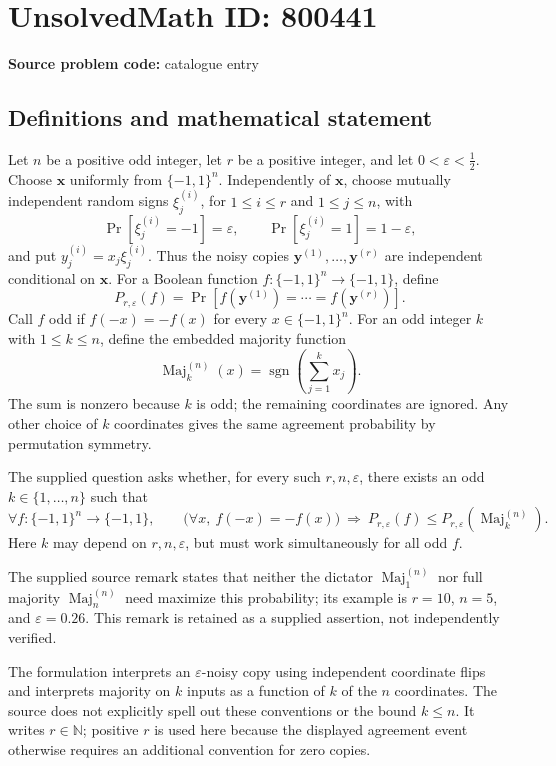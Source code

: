 \documentclass[11pt]{article}
\begin{document}
\section*{UnsolvedMath ID: 800441}
\textbf{Source problem code:} catalogue entry
\subsection{Definitions and mathematical statement}
Let \(n\) be a positive odd integer, let \(r\) be a positive integer, and let \(0<\varepsilon<\tfrac12\). Choose \(\mathbf{x}\) uniformly from \(\{-1,1\}^n\). Independently of \(\mathbf{x}\), choose mutually independent random signs \(\xi_j^{(i)}\), for \(1\le i\le r\) and \(1\le j\le n\), with
\[
\Pr[\xi_j^{(i)}=-1]=\varepsilon,\qquad \Pr[\xi_j^{(i)}=1]=1-\varepsilon,
\]
and put \(y_j^{(i)}=x_j\xi_j^{(i)}\). Thus the noisy copies \(\mathbf{y}^{(1)},\ldots,\mathbf{y}^{(r)}\) are independent conditional on \(\mathbf{x}\). For a Boolean function \(f:\{-1,1\}^n\to\{-1,1\}\), define
\[
P_{r,\varepsilon}(f)=\Pr\!\left[f(\mathbf{y}^{(1)})=\cdots=f(\mathbf{y}^{(r)})\right].
\]
Call \(f\) odd if \(f(-x)=-f(x)\) for every \(x\in\{-1,1\}^n\). For an odd integer \(k\) with \(1\le k\le n\), define the embedded majority function
\[
\operatorname{Maj}_{k}^{(n)}(x)=\operatorname{sgn}\!\left(\sum_{j=1}^{k}x_j\right).
\]
The sum is nonzero because \(k\) is odd; the remaining coordinates are ignored. Any other choice of \(k\) coordinates gives the same agreement probability by permutation symmetry.

The supplied question asks whether, for every such \(r,n,\varepsilon\), there exists an odd \(k\in\{1,\ldots,n\}\) such that
\[
\forall f:\{-1,1\}^n\to\{-1,1\},\qquad
\bigl(\forall x,\ f(-x)=-f(x)\bigr)
\ \Longrightarrow\ 
P_{r,\varepsilon}(f)\le P_{r,\varepsilon}\!\left(\operatorname{Maj}_{k}^{(n)}\right).
\]
Here \(k\) may depend on \(r,n,\varepsilon\), but must work simultaneously for all odd \(f\).

The supplied source remark states that neither the dictator \(\operatorname{Maj}_{1}^{(n)}\) nor full majority \(\operatorname{Maj}_{n}^{(n)}\) need maximize this probability; its example is \(r=10\), \(n=5\), and \(\varepsilon=0.26\). This remark is retained as a supplied assertion, not independently verified.

The formulation interprets an \(\varepsilon\)-noisy copy using independent coordinate flips and interprets majority on \(k\) inputs as a function of \(k\) of the \(n\) coordinates. The source does not explicitly spell out these conventions or the bound \(k\le n\). It writes \(r\in\mathbb{N}\); positive \(r\) is used here because the displayed agreement event otherwise requires an additional convention for zero copies.
\end{document}
